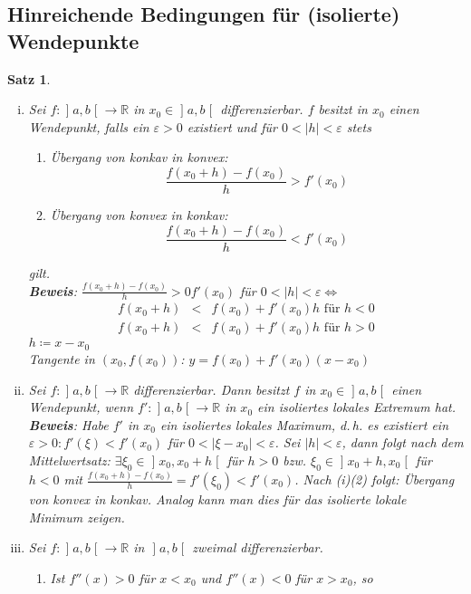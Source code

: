 \documentclass[ngerman,titlepage,twoside, parskip=half*]{scrreprt}
\newcommand*{\R}{\mathbb{R}}
\theoremstyle{plain}
\newtheorem{theorem}{Satz}[section]
\theoremstyle{definition}
\theoremstyle{remark}
\newcommand*{\bsofint}[1]{\mathopen{]}#1\mathclose{[}} %
\begin{document}
\subsection{Hinreichende Bedingungen für (isolierte) Wendepunkte}
\begin{theorem}
  \begin{enumerate}[(i)]
    \item Sei $f\colon\bsofint{a,b}\rightarrow\R$ in $x_0\in\bsofint{a,b}$ differenzierbar.
      $f$ besitzt in $x_0$ einen Wendepunkt, falls ein $\varepsilon>0$
      existiert und für $0<|h|<\varepsilon$ stets
      \begin{enumerate}[(1)]
	\item Übergang von konkav in konvex:
	  \[\frac{f(x_0+h)-f(x_0)}{h}>f'(x_0)\]
	\item Übergang von konvex in konkav:
	  \[\frac{f(x_0+h)-f(x_0)}{h}<f'(x_0)\]
      \end{enumerate}
      gilt.\\
      \textbf{Beweis}: $\frac{f(x_0+h)-f(x_0)}{h}>0f'(x_0)$ für $0<|h|
      <\varepsilon\Leftrightarrow$
      \begin{align*}
	f(x_0+h) & < & f(x_0)+f'(x_0)h \text{ für } h<0\\
	f(x_0+h) & < & f(x_0)+f'(x_0)h \text{ für } h>0
      \end{align*}
      $h\coloneqq x-x_0$\\
      Tangente in $(x_0,f(x_0))$: $y=f(x_0)+f'(x_0)(x-x_0)$
    \item Sei $f\colon\bsofint{a,b}\rightarrow\R$ differenzierbar. Dann besitzt $f$
      in $x_0\in\bsofint{a,b}$ einen Wendepunkt, wenn $f'\colon\bsofint{a,b}\rightarrow\R$
      in $x_0$ ein isoliertes lokales Extremum hat.\\
      \textbf{Beweis}: Habe $f'$ in $x_0$ ein isoliertes lokales Maximum,
      d.\,h. es existiert ein $\varepsilon>0\colon f'(\xi)<f'(x_0)$ für $0<
      |\xi-x_0|<\varepsilon$. Sei $|h|<\varepsilon$, dann folgt nach dem
      Mittelwertsatz: $\exists\xi_0\in \bsofint{x_0,x_0+h}$ für $h>0$ bzw.
      $\xi_0\in \bsofint{x_0+h,x_0}$ für $h<0$ mit $\frac{f(x_0+h)-f(x_0)}{h}
      =f'(\xi_0)<f'(x_0)$. Nach (i)(2) folgt: Übergang von konvex in
      konkav. Analog kann man dies für das isolierte lokale Minimum
      zeigen.
    \item Sei $f\colon\bsofint{a,b}\rightarrow\R$ in $\bsofint{a,b}$ zweimal differenzierbar.
      \begin{enumerate}[(1)]
	\item Ist $f''(x)>0$ für $x<x_0$ und $f''(x)<0$ für $x>x_0$, so

\end{enumerate}
\end{enumerate}
\end{theorem}
\end{document}
